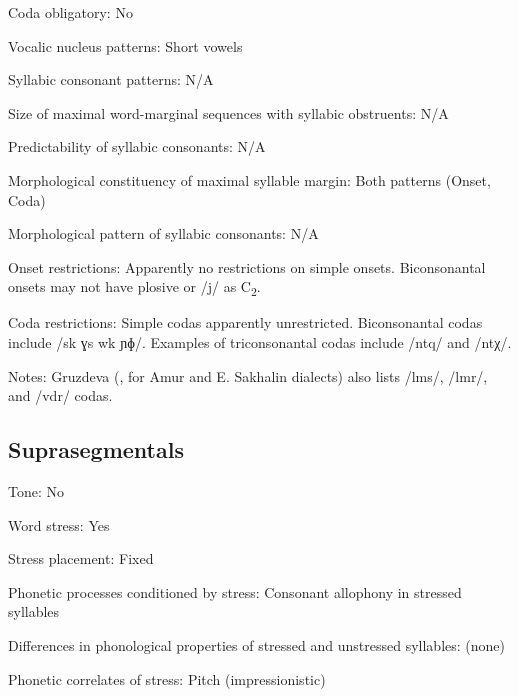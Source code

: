 {\begin{appendixdesc}
\item[Coda obligatory:] No

\item[Vocalic nucleus patterns:] Short vowels

\item[Syllabic consonant patterns:] N/A

\item[Size of maximal word-marginal sequences with syllabic obstruents:] N/A

\item[Predictability of syllabic consonants:] N/A

\item[Morphological constituency of maximal syllable margin:] Both patterns (Onset, Coda)

\item[Morphological pattern of syllabic consonants:] N/A

\item[Onset restrictions:] Apparently no restrictions on simple onsets. Biconsonantal onsets may not have plosive or /j/ as C\textsubscript{2}.

\item[Coda restrictions:] Simple codas apparently unrestricted. Biconsonantal codas include /sk ɣs wk ɲɸ/. Examples of triconsonantal codas include /ntq/ and /ntχ/.

\item[Notes:] Gruzdeva (\citeyear{Gruzdeva1998}, for Amur and E. Sakhalin dialects) also lists /lms/, /lmr/, and /vdr/ codas.
\end{appendixdesc}
\subsection*{Suprasegmentals}
\begin{appendixdesc}
\item[Tone:] No

\item[Word stress:] Yes

\item[Stress placement:] Fixed

\item[Phonetic processes conditioned by stress:] Consonant allophony in stressed syllables

\item[Differences in phonological properties of stressed and unstressed syllables:] (none)

\item[Phonetic correlates of stress:] Pitch (impressionistic)
\end{appendixdesc}
}
